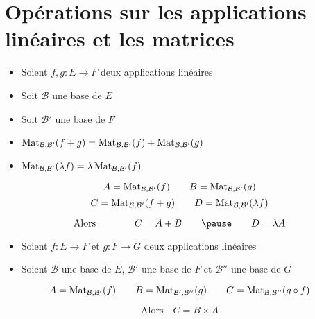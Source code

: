 \section{Opérations sur les applications linéaires et les matrices}

\begin{frame}

\begin{itemize}
  \item Soient $f,g : E \to F$ deux applications linéaires
  \pause
  \item Soit $\mathcal{B}$ une base de $E$
  \pause
  \item Soit $\mathcal{B}'$ une base de $F$
\end{itemize}

\pause
\begin{proposition}
\begin{itemize}
  \item $\mathop{\text{Mat}}\nolimits_{\mathcal{B},\mathcal{B}'} (f+g) = \mathop{\text{Mat}}\nolimits_{\mathcal{B},\mathcal{B}'} (f)
  + \mathop{\text{Mat}}\nolimits_{\mathcal{B},\mathcal{B}'} (g)$
  \pause
  \item $\mathop{\text{Mat}}\nolimits_{\mathcal{B},\mathcal{B}'} ( \lambda f) = \lambda \mathop{\text{Mat}}\nolimits_{\mathcal{B},\mathcal{B}'} (f)$
\end{itemize}
\end{proposition}

\pause
$$A = \mathop{\text{Mat}}\nolimits_{\mathcal{B},\mathcal{B}'} (f)
\qquad
B = \mathop{\text{Mat}}\nolimits_{\mathcal{B},\mathcal{B}'} (g)
$$
\pause
$$
C = \mathop{\text{Mat}}\nolimits_{\mathcal{B},\mathcal{B}'} (f+g)
\qquad
D = \mathop{\text{Mat}}\nolimits_{\mathcal{B},\mathcal{B}'} (\lambda f)$$

\pause
$$\text{Alors} \qquad \qquad C = A+B \qquad \pause\qquad D = \lambda A$$
\end{frame}


\begin{frame}

\begin{itemize}
  \item Soient $f : E \to F$  et $g : F \to G$ deux applications linéaires
  \pause
  \item Soient
$\mathcal{B}$ une base de $E$, $\mathcal{B}'$ une base de $F$
et $\mathcal{B}''$ une base de $G$

\end{itemize}

\pause
\begin{proposition}
\label{prop:multmatlin}
\end{proposition}

\pause
$$A = \mathop{\text{Mat}}\nolimits_{\mathcal{B},\mathcal{B}'} (f)
\qquad
B = \mathop{\text{Mat}}\nolimits_{\mathcal{B}',\mathcal{B}''} (g)
\qquad
C = \mathop{\text{Mat}}\nolimits_{\mathcal{B},\mathcal{B}''} (g \circ f)$$
 
$$\text{Alors} \quad C = B\times A$$ 

\end{frame}



